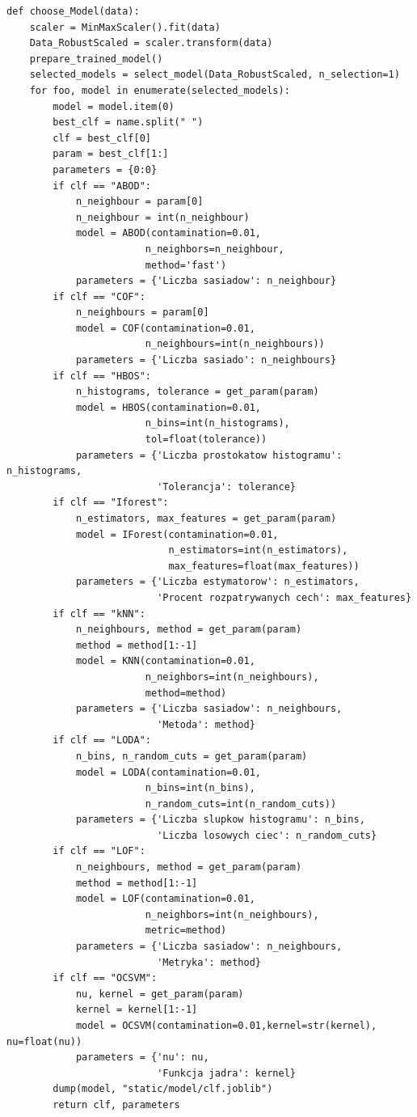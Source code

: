 \begin{lstlisting}
def choose_Model(data):
    scaler = MinMaxScaler().fit(data)
    Data_RobustScaled = scaler.transform(data)
    prepare_trained_model()
    selected_models = select_model(Data_RobustScaled, n_selection=1)
    for foo, model in enumerate(selected_models):
        model = model.item(0)
        best_clf = name.split(" ")
        clf = best_clf[0]
        param = best_clf[1:]
        parameters = {0:0}
        if clf == "ABOD":
            n_neighbour = param[0]
            n_neighbour = int(n_neighbour)
            model = ABOD(contamination=0.01,
                        n_neighbors=n_neighbour, 
                        method='fast')
            parameters = {'Liczba sasiadow': n_neighbour}
        if clf == "COF":
            n_neighbours = param[0]
            model = COF(contamination=0.01,
                        n_neighbours=int(n_neighbours))
            parameters = {'Liczba sasiado': n_neighbours}
        if clf == "HBOS":
            n_histograms, tolerance = get_param(param)
            model = HBOS(contamination=0.01,
                        n_bins=int(n_histograms),
                        tol=float(tolerance))
            parameters = {'Liczba prostokatow histogramu': n_histograms,
                          'Tolerancja': tolerance}
        if clf == "Iforest":
            n_estimators, max_features = get_param(param)
            model = IForest(contamination=0.01,
                            n_estimators=int(n_estimators),
                            max_features=float(max_features))
            parameters = {'Liczba estymatorow': n_estimators,
                          'Procent rozpatrywanych cech': max_features}
        if clf == "kNN":
            n_neighbours, method = get_param(param)
            method = method[1:-1]
            model = KNN(contamination=0.01,
                        n_neighbors=int(n_neighbours),
                        method=method)
            parameters = {'Liczba sasiadow': n_neighbours,
                          'Metoda': method}
        if clf == "LODA":
            n_bins, n_random_cuts = get_param(param)
            model = LODA(contamination=0.01,
                        n_bins=int(n_bins),
                        n_random_cuts=int(n_random_cuts))
            parameters = {'Liczba slupkow histogramu': n_bins,
                          'Liczba losowych ciec': n_random_cuts}
        if clf == "LOF":
            n_neighbours, method = get_param(param)
            method = method[1:-1]
            model = LOF(contamination=0.01,
                        n_neighbors=int(n_neighbours),
                        metric=method)
            parameters = {'Liczba sasiadow': n_neighbours,
                          'Metryka': method}
        if clf == "OCSVM":
            nu, kernel = get_param(param)
            kernel = kernel[1:-1]
            model = OCSVM(contamination=0.01,kernel=str(kernel), nu=float(nu))
            parameters = {'nu': nu,
                          'Funkcja jadra': kernel}
        dump(model, "static/model/clf.joblib")
        return clf, parameters

\end{lstlisting}

